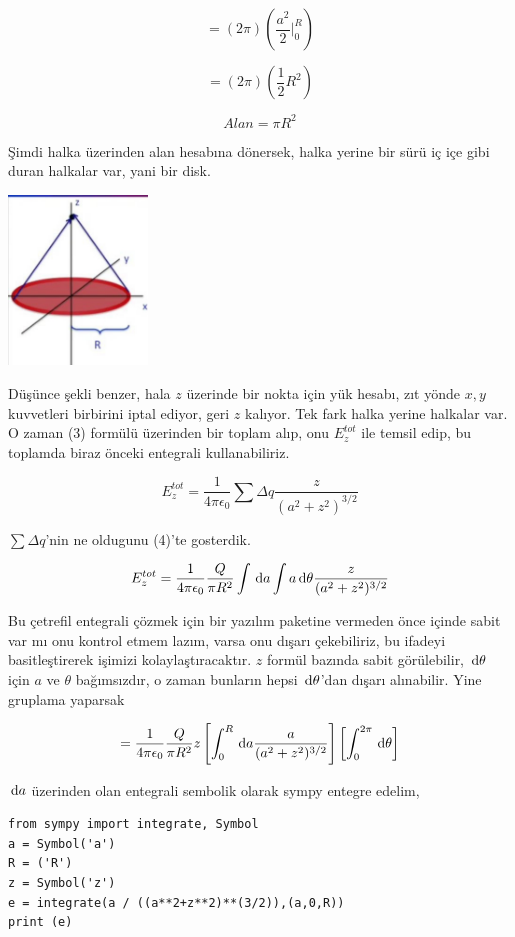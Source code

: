 \documentclass[12pt,fleqn]{article}\usepackage{../../common}
\begin{document}
$$
= (2\pi) \left( \frac{a^2}{2} \biggr\rvert_{0}^{R} \right)
$$

$$
= (2\pi) (\frac{1}{2}R^2)
$$

$$
Alan = \pi R^2
$$

Şimdi halka üzerinden alan hesabına dönersek, halka yerine bir sürü iç içe gibi
duran halkalar var, yani bir disk. 

\includegraphics[width=10em]{06_10.jpg}

Düşünce şekli benzer, hala $z$ üzerinde bir nokta için yük hesabı, zıt yönde
$x,y$ kuvvetleri birbirini iptal ediyor, geri $z$ kalıyor. Tek fark halka yerine
halkalar var. O zaman (3) formülü üzerinden bir toplam alıp, onu $E_z^{tot}$ ile
temsil edip, bu toplamda biraz önceki entegrali kullanabiliriz.

$$
E_z^{tot} =
\frac{1}{4\pi\epsilon_0 }
\sum \Delta q
\frac{z}{(a^2 + z^2)^{3/2}}
$$

$\sum \Delta q$'nin ne oldugunu (4)'te gosterdik. 

$$
E_z^{tot} =
\frac{1}{4\pi\epsilon_0 }
\frac{Q}{\pi R^2} \int \,\mathrm{d} a \int a \,\mathrm{d}\theta 
\frac{z}{(a^2 + z^2)^{3/2}}
$$

Bu çetrefil entegrali çözmek için bir yazılım paketine vermeden önce içinde
sabit var mı onu kontrol etmem lazım, varsa onu dışarı çekebiliriz, bu ifadeyi
basitleştirerek işimizi kolaylaştıracaktır. $z$ formül bazında sabit
görülebilir, $\,\mathrm{d} \theta$ için $a$ ve $\theta$ bağımsızdır, o zaman bunların
hepsi $\,\mathrm{d} \theta$'dan dışarı alınabilir. Yine gruplama yaparsak

$$
= \frac{1}{4\pi\epsilon_0 }
\frac{Q}{\pi R^2}
z \left[
\int_{0}^{R} \,\mathrm{d} a
\frac{a}{(a^2 + z^2)^{3/2}}
\right]
\left[ \int_{0}^{2\pi} \,\mathrm{d} \theta \right]
$$

$\,\mathrm{d} a$ üzerinden olan entegrali sembolik olarak sympy entegre edelim,

\begin{verbatim}
from sympy import integrate, Symbol
a = Symbol('a')
R = ('R')
z = Symbol('z')
e = integrate(a / ((a**2+z**2)**(3/2)),(a,0,R))
print (e)
\end{verbatim}
\end{document}
